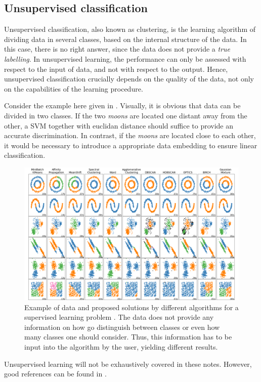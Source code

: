 \documentclass[]{report}
\begin{document}
\subsection{Unsupervised classification}\label{sec.unsupervised-classification}

Unsupervised classification, also known as clustering, is the learning algorithm of dividing data in several classes, based on the internal structure of the data. In this case, there is no right answer, since the data does not provide a \textit{true labelling}. In unsupervised learning, the performance can only be assessed with respect to the input of data, and not with respect to the output. Hence, unsupervised classification crucially depends on the quality of the data, not only on the capabilities of the learning procedure. 

Consider the example here given in . Visually, it is obvious that data can be divided in two classes. If the two \textit{moons} are located one distant away from the other, a SVM together with euclidan distance should suffice to provide an accurate discrimination. In contrast, if the \textit{moons} are located close to each other, it would be necessary to introduce a appropriate data embedding to ensure linear classification. 

\begin{figure}
\centering
\includegraphics[width = .7\linewidth]{images/cluster_datasets}
\caption{Example of data and proposed solutions by different algorithms for a supervised learning problem \cite{pedregosa2011scikitlearn}. The data does not provide any information on how go distinguish between classes or even how many classes one should consider. Thus, this information has to be input into the algorithm by the user, yielding different results. }
\label{fig.unsupervised-learning}
\end{figure}

Unsupervised learning will not be exhaustively covered in these notes. However, good references can be found in \cite{pedregosa2011scikitlearn}.
\end{document}
